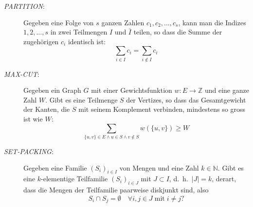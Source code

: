 \begin{description}
\[\]
%
\item[\textsl{PARTITION}:] Gegeben eine Folge von $s$ ganzen Zahlen
$c_1,c_2,\dots,c_s$, kann man die Indizes $1,2,\dots,s$ in zwei
Teilmengen $I$ und $\bar I$ teilen, so dass die Summe der zugehörigen
$c_i$ identisch ist:
\[
\sum_{i\in I}c_i=\sum_{i\not\in I}c_i
\]
%
\item[\textsl{MAX-CUT}:] Gegeben ein Graph $G$ mit einer Gewichtsfunktion
$w\colon E\to\mathbb Z$ und eine ganze Zahl $W$.
Gibt es eine Teilmenge
$S$ der Vertizes, so dass das Gesamtgewicht der Kanten, die $S$ mit
seinem Komplement verbinden, mindestens so gross ist wie $W$:
\[
\sum_{\{u,v\}\in E\wedge u\in S\wedge v\not\in S} w(\{u,v\})\ge W
\]
%
\item[\textsl{SET-PACKING}:] Gegeben eine Familie $(S_i)_{i\in I}$ von
Mengen und eine Zahl $k\in \mathbb N$.
Gibt es eine $k$-elementige Teilfamilie $(S_i)_{i\in J}$ mit $J\subset I$,
d.~h.~$|J|=k$,
derart,
dass die Mengen der Teilfamilie paarweise diskjunkt sind, also 
\[
	S_i \cap S_j = \emptyset \quad\forall i,j\in J \;\text{mit}\; i\ne j?
\]
\end{description}



